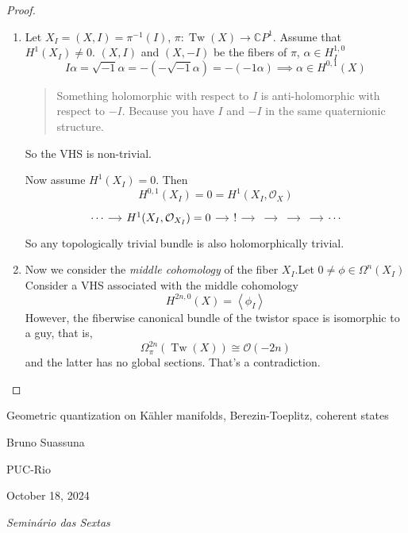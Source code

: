 \begin{proof}
\begin{enumerate}[label=\textbf{Step \arabic*}]
\item Let $X_I=(X,I)=\pi^{-1}(I)$, $\pi:\operatorname{Tw}(X)\to \mathbb{C}P^{1}$. Assume that $H^{1}(X_I)\neq 0$. $(X,I)$ and $(X,-I)$ be the fibers of  $\pi$, $\alpha\in H^{1,0}_I$
	\[I\alpha=\sqrt{-1}\alpha=-(-\sqrt{-1}\alpha)=-(-1\alpha)\implies \alpha\in H^{0,1}(X)\]
{\color{4}\begin{quotation}
	Something holomorphic with respect to $I$ is anti-holomorphic with respect to $-I$. Because you have $I$ and  $-I$ in the same quaternionic structure.
\end{quotation}}

So the VHS is non-trivial.

Now assume $H^{1}(X_I)=0$. Then
\[H^{0,1}(X_I)=0=H^{1}(X_I,\mathcal{O}_X)\]
\[\begin{tikzcd}[column sep=small]
	\cdots\arrow[r]&H^{1}(X_I,\mathcal{O}_{X_I})=0\arrow[r]&!\arrow[r]&\arrow[r]&\arrow[r]&\arrow[r]&\cdots
\end{tikzcd}\]
So any topologically trivial bundle is also holomorphically trivial.

\item Now we consider the \textit{middle cohomology} of the fiber $X_I$.Let $0\neq \phi\in\Omega^{n}(X_I)$ Consider a VHS associated with the middle cohomology
	\[H^{2n,0}(X)=\left<\phi_I\right> \]
However, the fiberwise canonical bundle of the twistor space is isomorphic to a guy, that is,
	\[\Omega^{2n}_\pi(\operatorname{Tw}(X))\cong \mathcal{O}(-2n)\]
and the latter has no global sections. That's a contradiction.


\end{enumerate}\end{proof}


\clearpage{}
{\Huge Geometric quantization on Kähler manifolds, Berezin-Toeplitz, coherent states}

\hfill{\Large Bruno Suassuna}

{\Large \hfill PUC-Rio}

\hfill{\large October 18, 2024

\hfill \textit{Seminário das Sextas}}

